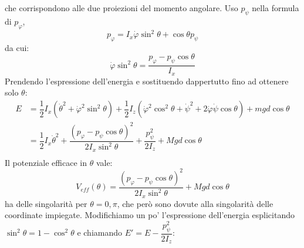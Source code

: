 \documentclass[a4paper,openany]{article}
\begin{document}
	che corrispondono alle due proiezioni del momento angolare. Uso $p_{\psi}$ nella formula di $p_{\varphi}$, 
	$$
	p_{\varphi} = I_x \dot{\varphi}\sin^2\theta + \cos\theta p_{\psi}
	$$
	da cui:
	$$
	\dot{\varphi}\sin^2\theta = \dfrac{p_{\varphi}- p_{\psi}\cos\theta}{I_x}
	$$
	Prendendo l'espressione dell'energia e sostituendo dappertutto fino ad ottenere solo $\theta$:
	\begin{equation}\label{key}
		\begin{aligned}
			E &= \dfrac{1}{2}I_x (\dot{\theta}^{2}+ \dot{\varphi}^2\sin^{2}\theta)+\dfrac{1}{2}I_z(\dot{\varphi}^{2}\cos^{2}\theta+\dot{\psi}^{2}+2\dot{\varphi}\dot{\psi}\cos\theta) + mgd\cos\theta \\
			&= \dfrac{1}{2}I_x\dot{\theta}^{2} + \dfrac{(p_{\varphi}- p_{\psi}\cos\theta)^2}{2I_x\sin^2\theta} + \dfrac{p_{\psi}^{2}}{2I_z} + Mgd\cos\theta \\
		\end{aligned}
	\end{equation}
	Il potenziale efficace in $\theta$ vale:
	$$
	V_{eff}(\theta) = \dfrac{(p_{\varphi}- p_{\psi}\cos\theta)^2}{2I_x\sin^2\theta} + Mgd\cos\theta 
	$$
	ha delle singolarità per $\theta = 0,\pi$, che però sono dovute alla singolarità delle coordinate impiegate. Modifichiamo un po' l'espressione dell'energia esplicitando $\sin^2\theta = 1-\cos^2\theta$ e chiamando $E' = E - \dfrac{p_{\psi}^2}{2I_z}$:
	
\end{document}
